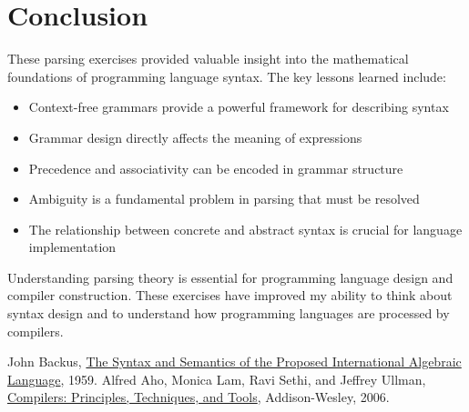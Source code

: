 \documentclass{article}
\theoremstyle{plain}
\theoremstyle{definition}
\theoremstyle{remark}
\begin{document}
\section{Conclusion}\label{conclusion}

These parsing exercises provided valuable insight into the mathematical foundations of programming language syntax. The key lessons learned include:

\begin{itemize}
\item Context-free grammars provide a powerful framework for describing syntax
\item Grammar design directly affects the meaning of expressions
\item Precedence and associativity can be encoded in grammar structure
\item Ambiguity is a fundamental problem in parsing that must be resolved
\item The relationship between concrete and abstract syntax is crucial for language implementation
\end{itemize}

Understanding parsing theory is essential for programming language design and compiler construction. These exercises have improved my ability to think about syntax design and to understand how programming languages are processed by compilers.

\begin{thebibliography}{99}
 John Backus, \href{https://en.wikipedia.org/wiki/Backus%E2%80%93Naur_form}{The Syntax and Semantics of the Proposed International Algebraic Language}, 1959.
 Alfred Aho, Monica Lam, Ravi Sethi, and Jeffrey Ullman, \href{https://en.wikipedia.org/wiki/Compiler}{Compilers: Principles, Techniques, and Tools}, Addison-Wesley, 2006.
\end{thebibliography}
\end{document}
